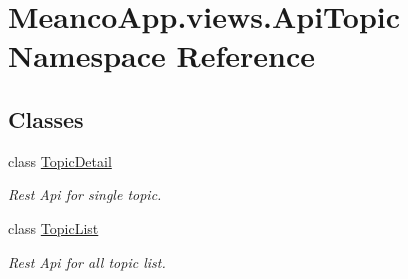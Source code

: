 \hypertarget{namespace_meanco_app_1_1views_1_1_api_topic}{}\section{Meanco\+App.\+views.\+Api\+Topic Namespace Reference}
\label{namespace_meanco_app_1_1views_1_1_api_topic}
\subsection*{Classes}
\begin{DoxyCompactItemize}
\item 
class \hyperlink{class_meanco_app_1_1views_1_1_api_topic_1_1_topic_detail}{Topic\+Detail}
\begin{DoxyCompactList}\small\item\em Rest Api for single topic. \end{DoxyCompactList}\item 
class \hyperlink{class_meanco_app_1_1views_1_1_api_topic_1_1_topic_list}{Topic\+List}
\begin{DoxyCompactList}\small\item\em Rest Api for all topic list. \end{DoxyCompactList}\end{DoxyCompactItemize}
